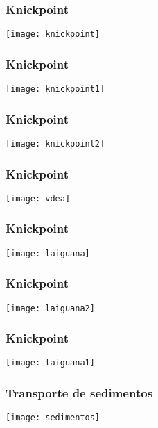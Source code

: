 \documentclass{beamer}
\begin{document}
\begin{frame}
\frametitle{Knickpoint}
\begin{center}
   	\texttt{[image: knickpoint]}
\end{center}
\end{frame}
\begin{frame}
\frametitle{Knickpoint}
\begin{center}
   	\texttt{[image: knickpoint1]}
\end{center}
\end{frame}
\begin{frame}
\frametitle{Knickpoint}
\begin{center}
   	\texttt{[image: knickpoint2]}
\end{center}
\end{frame}
\begin{frame}
\frametitle{Knickpoint}
\begin{center}
   	\texttt{[image: vdea]}
\end{center}
\end{frame}
\begin{frame}
\frametitle{Knickpoint}
\begin{center}
   	\texttt{[image: laiguana]}
\end{center}
\end{frame}
\begin{frame}
\frametitle{Knickpoint}
\begin{center}
   	\texttt{[image: laiguana2]}
\end{center}
\end{frame}
\begin{frame}
\frametitle{Knickpoint}
\begin{center}
   	\texttt{[image: laiguana1]}
\end{center}
\end{frame}
\begin{frame}
\frametitle{Transporte de sedimentos}
\begin{center}
   	\texttt{[image: sedimentos]}
\end{center}
\end{frame}
\end{document}
